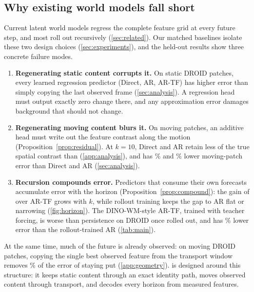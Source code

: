 \subsection{Why existing world models fall short}\label{app:why-short}
Current latent world models regress the complete feature grid at every future step, and most roll out recursively
(\cref{sec:related}). Our matched baselines isolate these two design choices (\cref{sec:experiments}), and the held-out
results show three concrete failure modes.
\begin{enumerate}[leftmargin=1.4em,itemsep=1pt,topsep=2pt]
  \item \textbf{Regenerating static content corrupts it.} On static DROID patches, every learned regression predictor
  (Direct, AR, AR-TF) has higher error than simply copying the last observed frame (\cref{sec:analysis}). A regression head
  must output exactly zero change there, and any approximation error damages background that should not change.
  \item \textbf{Regenerating moving content blurs it.} On moving patches, an additive head must write out the feature
  contrast along the motion (Proposition~\ref{prop:residual}). At $k{=}10$, Direct and AR retain less of the true spatial
  contrast than \ours{} (\cref{app:analysis}), and \ours{} has \droidMovingVsDirect\% and \droidMovingVsAR\% lower
  moving-patch error than Direct and AR (\cref{sec:analysis}).
  \item \textbf{Recursion compounds error.} Predictors that consume their own forecasts accumulate error with the horizon
  (Proposition~\ref{prop:compound}): the gain of \ours{} over AR-TF grows with $k$, while rollout training keeps the gap to AR flat or narrowing (\cref{fig:horizon}). The DINO-WM-style AR-TF, trained with teacher forcing, is worse
  than persistence on DROID once rolled out, and \ours{} has \droidVsAR\% lower error than the rollout-trained AR
  (\cref{tab:main}).
\end{enumerate}
At the same time, much of the future is already observed: on moving DROID patches, copying the single best observed
feature from the transport window removes \geoOracleRed\% of the error of staying put (\cref{app:geometry}). \ours{} is
designed around this structure: it keeps static content through an exact identity path, moves observed content through
transport, and decodes every horizon from measured features.

\FloatBarrier
